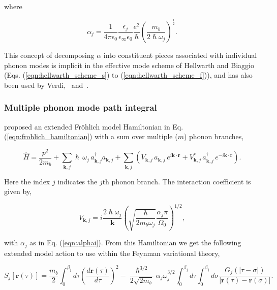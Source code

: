 where

\begin{equation}
\alpha_j = \frac{1}{4\pi\epsilon_0}  \frac{\epsilon_j}{\epsilon_{\infty}\epsilon_{0}} \frac{e^2}{\hslash} \left( \frac{m_b}{2\hslash\omega_j} \right)^{\frac{1}{2}}.
    \label{eqn:alphai}
\end{equation}

This concept of decomposing $\alpha$ into constituent pieces associated with individual phonon modes is implicit in the effective mode scheme of Hellwarth and Biaggio (Eqs. (\ref{eqn:hellwarth_scheme_s}) to (\ref{eqn:hellwarth_scheme_f})), and has also been used by Verdi,~\cite{verbist_extended_1992} and~\cite{devreese_many-body_2010}.

\subsubsection{Multiple phonon mode path integral}

\cite{verbist_extended_1992} proposed an extended Fr\"ohlich model Hamiltonian in Eq. (\ref{eqn:frohlich_hamiltonian}) with a sum over multiple ($m$) phonon branches,

\begin{equation}
    \hat{H} = \frac{p^2}{2m_b} + \sum_{\mathbf{k}, j} \hslash \, \omega_{j} \, a_{\mathbf{k}, j}^\dagger a_{\mathbf{k}, j}
    + \sum_{\mathbf{k}, j} ( V_{\mathbf{k}, j} \, a_{\mathbf{k}, j} \, e^{i\mathbf{k} \cdot \mathbf{r}} + V_{\mathbf{k}, j}^* \, a_{\mathbf{k}, j}^\dagger \, e^{-i\mathbf{k} \cdot \mathbf{r}}) .
\label{eqn:multifrohlich}
\end{equation}

Here the index $j$ indicates the $j$th phonon branch. The interaction coefficient is given by,

\begin{equation}
    V_{\mathbf{k}, j} = i\frac{2 \hslash \omega_j}{\mathbf{k}} \left(\sqrt{\frac{\hslash}{2 m_b \omega_j}} \frac{\alpha_j \pi}{\Omega_0} \right)^{1/2},
\end{equation}

with $\alpha_j$ as in Eq. (\ref{eqn:alphai}). From this Hamiltonian we get the following extended model action to use within the Feynman variational theory,

\begin{equation}
        S_j[\mathbf{r}(\tau)] =
        \frac{m_b}{2}\int^{\beta_j}_0 d\tau \left(\frac{d\mathbf{r}(\tau)}{d\tau}\right)^2 -
        \frac{\hslash^{3/2}}{2\sqrt{2 m_b}} \alpha_j \omega_{j}^{3/2} \int^{\beta_j}_0 d\tau \int^{\beta_j}_0 d\sigma \frac{G_j(|\tau - \sigma|)}{|\mathbf{r}(\tau) - \mathbf{r}(\sigma)|} .
\label{eqn:multiaction}
\end{equation}

